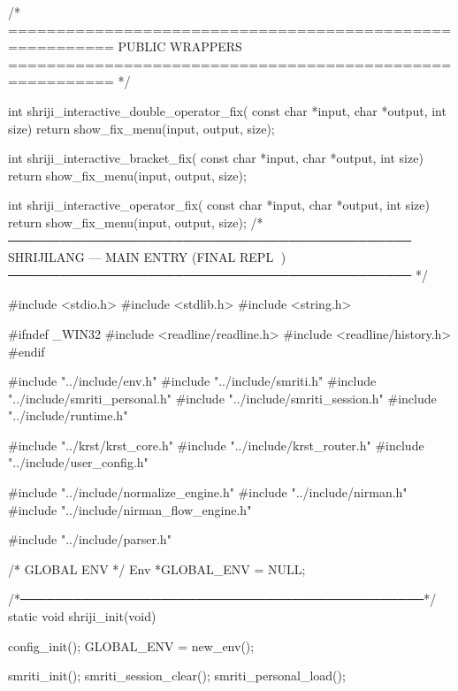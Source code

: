 \documentclass{article}
\begin{document}
/* =========================================================
   PUBLIC WRAPPERS
========================================================= */

int shriji_interactive_double_operator_fix(
    const char *input,
    char *output,
    int size)
{
    return show_fix_menu(input, output, size);
}

int shriji_interactive_bracket_fix(
    const char *input,
    char *output,
    int size)
{
    return show_fix_menu(input, output, size);
}

int shriji_interactive_operator_fix(
    const char *input,
    char *output,
    int size)
{
    return show_fix_menu(input, output, size);
}
/*
──────────────────────────────────────────────
    SHRIJILANG — MAIN ENTRY (FINAL REPL 🌸)
──────────────────────────────────────────────
*/

#include <stdio.h>
#include <stdlib.h>
#include <string.h>

#ifndef _WIN32
#include <readline/readline.h>
#include <readline/history.h>
#endif

#include "../include/env.h"
#include "../include/smriti.h"
#include "../include/smriti_personal.h"
#include "../include/smriti_session.h"
#include "../include/runtime.h"

#include "../krst/krst_core.h"
#include "../include/krst_router.h"
#include "../include/user_config.h"

#include "../include/normalize_engine.h"
#include "../include/nirman.h"
#include "../include/nirman_flow_engine.h"

#include "../include/parser.h"

/* GLOBAL ENV */
Env *GLOBAL_ENV = NULL;

/*──────────────────────────────────────────────*/
static void shriji_init(void)
{
    config_init();
    GLOBAL_ENV = new_env();

    smriti_init();
    smriti_session_clear();
    smriti_personal_load();
}
\end{document}
